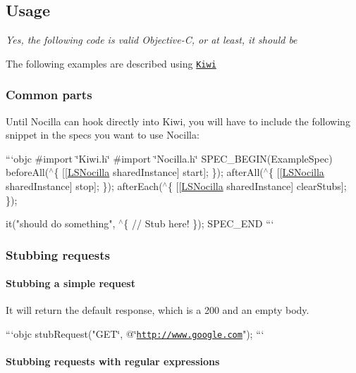 \subsection*{Usage}

{\itshape Yes, the following code is valid Objective-\/\-C, or at least, it should be}

The following examples are described using \href{https://github.com/kiwi-bdd/Kiwi}{\tt Kiwi}

\subsubsection*{Common parts}

Until Nocilla can hook directly into Kiwi, you will have to include the following snippet in the specs you want to use Nocilla\-:

```objc \#import \char`\"{}\-Kiwi.\-h\char`\"{} \#import \char`\"{}\-Nocilla.\-h\char`\"{} S\-P\-E\-C\-\_\-\-B\-E\-G\-I\-N(\-Example\-Spec) before\-All($^\wedge$\{ \mbox{[}\mbox{[}\hyperlink{interface_l_s_nocilla}{L\-S\-Nocilla} shared\-Instance\mbox{]} start\mbox{]}; \}); after\-All($^\wedge$\{ \mbox{[}\mbox{[}\hyperlink{interface_l_s_nocilla}{L\-S\-Nocilla} shared\-Instance\mbox{]} stop\mbox{]}; \}); after\-Each($^\wedge$\{ \mbox{[}\mbox{[}\hyperlink{interface_l_s_nocilla}{L\-S\-Nocilla} shared\-Instance\mbox{]} clear\-Stubs\mbox{]}; \});

it("should do something", $^\wedge$\{ // Stub here! \}); S\-P\-E\-C\-\_\-\-E\-N\-D ```

\subsubsection*{Stubbing requests}

\paragraph*{Stubbing a simple request}

It will return the default response, which is a 200 and an empty body.

```objc stub\-Request("G\-E\-T\char`\"{}, @\char`\"{}\href{http://www.google.com}{\tt http\-://www.\-google.\-com}"); ```

\paragraph*{Stubbing requests with regular expressions}

